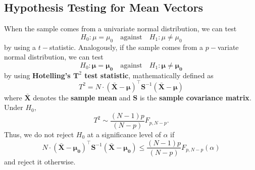 \subsection{Hypothesis Testing for Mean Vectors}
When the sample comes from a univariate normal distribution, we can test $$H_{0}: \mu=\mu_{0}\quad\mbox{against}\quad H_{1}: \mu \neq \mu_{0}$$ by using a $t-$statistic. Analogously, if the sample comes from a $p-$variate normal distribution, we can test $$H_{0}: \bm{\mu}=\bm{\mu_{0}}\quad\mbox{against}\quad H_{1}: \bm{\mu} \neq \bm{\mu_{0}}$$ by using \textbf{Hotelling's $\bm{T}^2$ test statistic}, mathematically  defined as
\begin{equation*}
    T^{2}=N\cdot (\bm{\bar{X}}-\bm{\mu})^{\!\top}\bm{S}^{-1}(\bm{\bar{X}}-\bm{\mu})
\end{equation*}
where $\bm{\bar{X}}$ denotes the \textbf{sample mean} and $\bm{S}$ is the \textbf{sample covariance matrix}.
Under $H_{0}$, $$T^{2}\sim \frac{(N-1)p}{(N-p)}F_{p, N-p}.$$ Thus, we do not reject $H_{0}$ at a significance level of $\alpha$ if 
\begin{equation}\label{eq:T2}
    N\cdot (\bm{\bar{X}}-\bm{\mu_{0}})^{\!\top}\bm{S}^{-1}(\bm{\bar{X}}-\bm{\mu_{0}}) \leq \frac{(N-1)p}{(N-p)}F_{p, N-p}(\alpha)
\end{equation}
and reject it otherwise.
